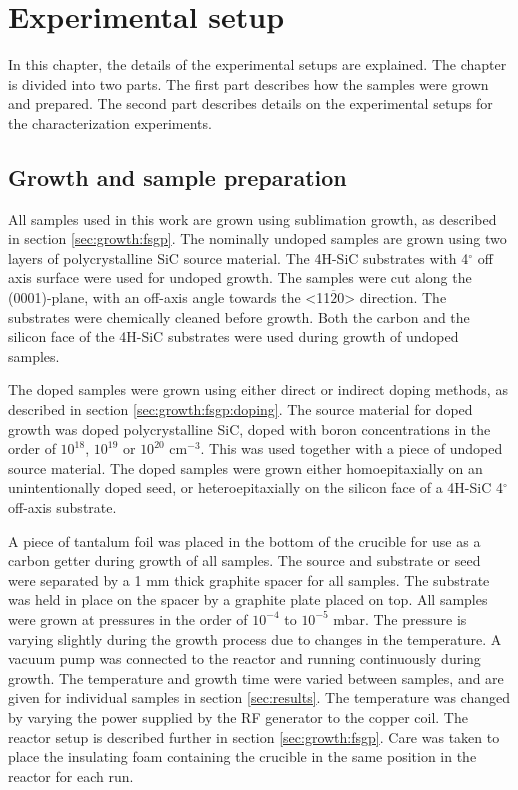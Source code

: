 
\chapter{Experimental setup}
\label{sec:experimental}
In this chapter, the details of the experimental setups are explained. The chapter is divided into two parts. The first part describes how the samples were grown and prepared. The second part describes details on the experimental setups for the characterization experiments. 

\section{Growth and sample preparation}
\label{sec:experimental:samples}
All samples used in this work are grown using sublimation growth, as described in section \ref{sec:growth:fsgp}. The nominally undoped samples are grown using two layers of polycrystalline SiC source material. The 4H-SiC substrates with 4$^\circ$ off axis surface were used for undoped growth. The samples were cut along the (0001)-plane, with an off-axis angle towards the <11$\overline{2}$0> direction. The substrates were chemically cleaned before growth. Both the carbon and the silicon face of the 4H-SiC substrates were used during growth of undoped samples. 

The doped samples were grown using either direct or indirect doping methods, as described in section \ref{sec:growth:fsgp:doping}. The source material for doped growth was doped polycrystalline SiC, doped with boron concentrations in the order of $10^{18}$, $10^{19}$ or $10^{20}$ cm$^{-3}$. This was used together with a piece of undoped source material. The doped samples were grown either homoepitaxially on an unintentionally doped seed, or heteroepitaxially on the silicon face of a 4H-SiC 4$^\circ$ off-axis substrate. 

A piece of tantalum foil was placed in the bottom of the crucible for use as a carbon getter during growth of all samples. The source and substrate or seed were separated by a 1 mm thick graphite spacer for all samples. The substrate was held in place on the spacer by a graphite plate placed on top. All samples were grown at pressures in the order of $10^{-4}$ to $10^{-5}$ mbar. The pressure is varying slightly during the growth process due to changes in the temperature. A vacuum pump was connected to the reactor and running continuously during growth. The temperature and growth time were varied between samples, and are given for individual samples in section \ref{sec:results}. The temperature was changed by varying the power supplied by the RF generator to the copper coil. The reactor setup is described further in section \ref{sec:growth:fsgp}. Care was taken to place the insulating foam containing the crucible in the same position in the reactor for each run. 

